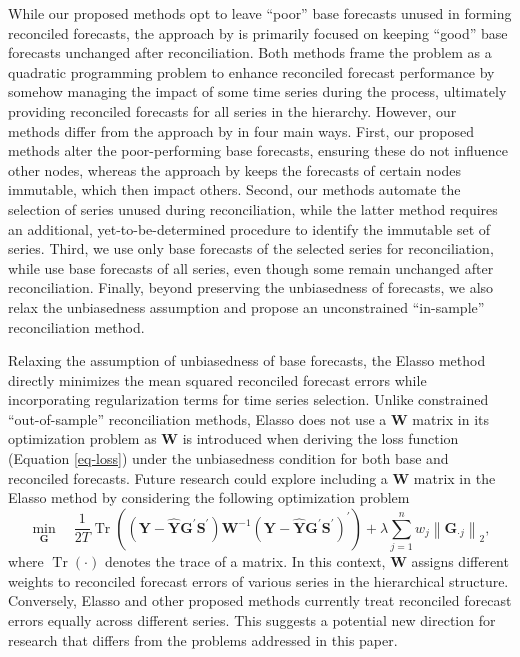 \documentclass[
  11pt]{article}
\theoremstyle{plain}
\theoremstyle{remark}
\begin{document}
While our proposed methods opt to leave ``poor'' base forecasts unused
in forming reconciled forecasts, the approach by \citet{Zhang2023-op} is
primarily focused on keeping ``good'' base forecasts unchanged after
reconciliation. Both methods frame the problem as a quadratic
programming problem to enhance reconciled forecast performance by
somehow managing the impact of some time series during the process,
ultimately providing reconciled forecasts for all series in the
hierarchy. However, our methods differ from the approach by
\citet{Zhang2023-op} in four main ways. First, our proposed methods
alter the poor-performing base forecasts, ensuring these do not
influence other nodes, whereas the approach by \citet{Zhang2023-op}
keeps the forecasts of certain nodes immutable, which then impact
others. Second, our methods automate the selection of series unused
during reconciliation, while the latter method requires an additional,
yet-to-be-determined procedure to identify the immutable set of series.
Third, we use only base forecasts of the selected series for
reconciliation, while \citet{Zhang2023-op} use base forecasts of all
series, even though some remain unchanged after reconciliation. Finally,
beyond preserving the unbiasedness of forecasts, we also relax the
unbiasedness assumption and propose an unconstrained ``in-sample''
reconciliation method.

Relaxing the assumption of unbiasedness of base forecasts, the Elasso
method directly minimizes the mean squared reconciled forecast errors
while incorporating regularization terms for time series selection.
Unlike constrained ``out-of-sample'' reconciliation methods, Elasso does
not use a \(\bm{W}\) matrix in its optimization problem as \(\bm{W}\) is
introduced when deriving the loss function (Equation \eqref{eq-loss})
under the unbiasedness condition for both base and reconciled forecasts.
Future research could explore including a \(\bm{W}\) matrix in the
Elasso method by considering the following optimization problem \[
\min_{\bm{G}} \quad \frac{1}{2 T} \operatorname{Tr}\left( \left(\bm{Y}-\hat{\bm{Y}} \bm{G}^{\prime} \bm{S}^{\prime}\right)\bm{W}^{-1}\left(\bm{Y}-\hat{\bm{Y}} \bm{G}^{\prime} \bm{S}^{\prime}\right)^{\prime}\right) + \lambda \sum_{j=1}^n w_j \left\|\bm{G}_{\cdot j}\right\|_2,
\] where \(\operatorname{Tr}(\cdot)\) denotes the trace of a matrix. In
this context, \(\bm{W}\) assigns different weights to reconciled
forecast errors of various series in the hierarchical structure.
Conversely, Elasso and other proposed methods currently treat reconciled
forecast errors equally across different series. This suggests a
potential new direction for research that differs from the problems
addressed in this paper.
\end{document}
